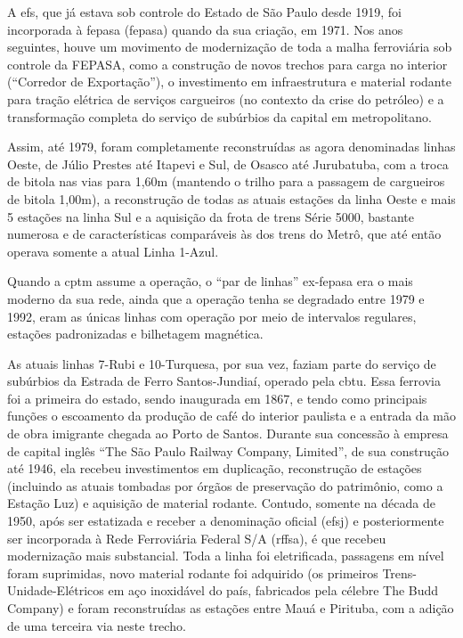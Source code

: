 \documentclass[11pt,fleqn]{book} %
\begin{document}

A \gls{efs}, que já estava sob controle do Estado de São Paulo desde 1919, foi incorporada à \glsdesc{fepasa} (\gls{fepasa}) quando da sua criação, em 1971. Nos anos seguintes, houve um movimento de modernização de toda a malha ferroviária sob controle da FEPASA, como a construção de novos trechos para carga no interior (\enquote{Corredor de Exportação}), o investimento em infraestrutura e material rodante para tração elétrica de serviços cargueiros (no contexto da crise do petróleo) e a transformação completa do serviço de subúrbios da capital em metropolitano.

Assim, até 1979, foram completamente reconstruídas as agora denominadas linhas Oeste, de Júlio Prestes até Itapevi e Sul, de Osasco até Jurubatuba, com a troca de bitola nas vias para 1,60m (mantendo o trilho para a passagem de cargueiros de bitola 1,00m), a reconstrução de todas as atuais estações da linha Oeste e mais 5 estações na linha Sul e a aquisição da frota de trens Série 5000, bastante numerosa e de características comparáveis às dos trens do Metrô, que até então operava somente a atual Linha 1-Azul.


Quando a \gls{cptm} assume a operação, o \enquote{par de linhas} ex-\gls{fepasa} era o mais moderno da sua rede, ainda que a operação tenha se degradado entre 1979 e 1992, eram as únicas linhas com operação por meio de intervalos regulares, estações padronizadas e bilhetagem magnética.

As atuais linhas 7-Rubi e 10-Turquesa, por sua vez, faziam parte do serviço de subúrbios da Estrada de Ferro Santos-Jundiaí, operado pela \gls{cbtu}. Essa ferrovia foi a primeira do estado, sendo inaugurada em 1867, e tendo como principais funções o escoamento da produção de café do interior paulista e a entrada da mão de obra imigrante chegada ao Porto de Santos. Durante sua concessão à empresa de capital inglês \enquote{The São Paulo Railway Company, Limited}, de sua construção até 1946, ela recebeu investimentos em duplicação, reconstrução de estações (incluindo as atuais tombadas por órgãos de preservação do patrimônio, como a Estação Luz) e aquisição de material rodante. Contudo, somente na década de 1950, após ser estatizada e receber a denominação oficial (\gls{efsj}) e posteriormente ser incorporada à Rede Ferroviária Federal S/A (\gls{rffsa}), é que recebeu modernização mais substancial. Toda a linha foi eletrificada, passagens em nível foram suprimidas, novo material rodante foi adquirido (os primeiros Trens-Unidade-Elétricos em aço inoxidável do país, fabricados pela célebre The Budd Company) e foram reconstruídas as estações entre Mauá e Pirituba, com a adição de uma terceira via neste trecho.
\end{document}
